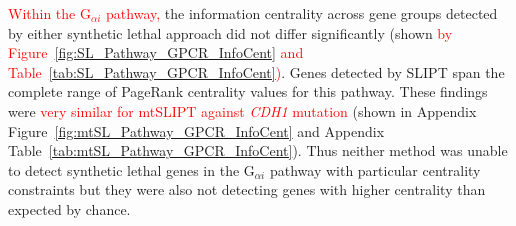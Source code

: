 
\textcolor{red}{Within the G$_{\alpha i}$ \gls{pathway},} the \gls{information centrality} across gene groups detected by either \gls{synthetic lethal} approach did not differ significantly (shown \textcolor{red}{by Figure~\ref{fig:SL_Pathway_GPCR_InfoCent} and Table~\ref{tab:SL_Pathway_GPCR_InfoCent})}. %
Genes detected by \gls{SLIPT} span the complete range of \gls{PageRank centrality} values for this \gls{pathway}. %
%
These findings were \textcolor{red}{very similar for mtSLIPT against \textit{CDH1} mutation} (shown in Appendix Figure~\ref{fig:mtSL_Pathway_GPCR_InfoCent} %
and Appendix Table~\ref{tab:mtSL_Pathway_GPCR_InfoCent}). Thus neither method was unable to detect \gls{synthetic lethal} genes in the G$_{\alpha i}$ \gls{pathway} with particular \gls{centrality} constraints but they were also not detecting genes with higher \gls{centrality} than expected by chance. 


